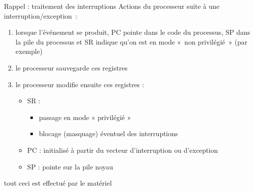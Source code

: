 \begin {frame} {Rappel : traitement des interruptions}
    Actions du processeur suite à une interruption/exception~:
    \begin {enumerate}
	\item lorsque l'événement se produit, PC pointe dans le code du
	    processus, SP dans la pile du processus et SR indique qu'on
	    est en mode «~non privilégié~» (par exemple)

	\item le processeur sauvegarde ces registres

	\item le processeur modifie ensuite ces registres :
	    \begin {itemize}
		\item SR :
		    \begin {itemize}
			\item passage en mode « privilégié »
			\item blocage (masquage) éventuel des interruptions
		    \end {itemize}

		\item PC : initialisé à partir du vecteur d'interruption
		    ou d'exception

		\item SP : pointe sur la pile noyau
	    \end {itemize}

    \end {enumerate}

    \vspace* {2mm}

    \implique tout ceci est effectué par le matériel
\end {frame}

